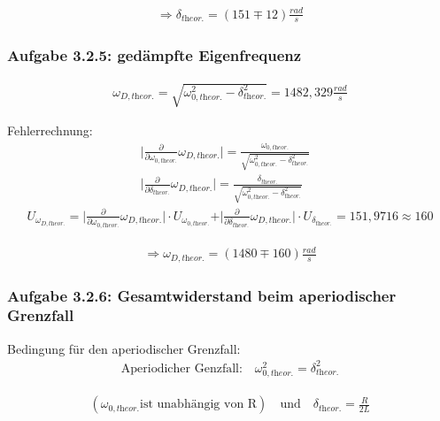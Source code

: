 \documentclass[a4paper]{scrartcl}
\numberwithin{equation}{subsection}
\begin{document}
\begin{align*}
\Rightarrow \delta_{\textit{theor.}} = (151 \mp 12) \frac{rad}{s}
\end{align*}

\subsubsection{Aufgabe 3.2.5: gedämpfte Eigenfrequenz}

\begin{align}
\omega_{D,\textit{theor.}} = \sqrt{\omega_{0,\textit{theor.}}^2 - \delta_{\textit{theor.}}^2} = 1482,329 \frac{rad}{s}
\end{align}

Fehlerrechnung:
\begin{align*}
\vert \frac{\partial}{\partial \omega_{0,\textit{theor.}}}\omega_{D,\textit{theor.}}\vert = \frac{\omega_{0,\textit{theor.}}}{\sqrt{\omega_{0,\textit{theor.}}^2 - \delta_{\textit{theor.}}^2}} &\\
\vert \frac{\partial}{\partial \delta_{\textit{theor.}}}\omega_{D,\textit{theor.}}\vert = \frac{\delta_{\textit{theor.}}}{\sqrt{\omega_{0,\textit{theor.}}^2 - \delta_{\textit{theor.}}^2}} &
\end{align*}
\begin{align*}
U_{\omega_{D,\textit{theor.}}} = \vert \frac{\partial}{\partial \omega_{0,\textit{theor.}}}\omega_{D,\textit{theor.}}\vert \cdot U_{\omega_{0,\textit{theor.}}} + \vert \frac{\partial}{\partial \delta_{\textit{theor.}}}\omega_{D,\textit{theor.}}\vert \cdot U_{\delta_{\textit{theor.}}} = 151,9716 \approx 160
\end{align*}

\begin{align*}
\Rightarrow \omega_{D,\textit{theor.}} = (1480 \mp 160) \frac{rad}{s}
\end{align*}

\subsubsection{Aufgabe 3.2.6: Gesamtwiderstand beim aperiodischer Grenzfall}

Bedingung für den aperiodischer Grenzfall:
\begin{align}
\text{Aperiodicher Genzfall:} \quad \omega_{0,\textit{theor.}}^2 = \delta_{\textit{theor.}}^2
\end{align}

\begin{align*}
(\omega_{0,\textit{theor.}} \text{ist unabhängig von R}) \quad \text{und} \quad
\delta_{\textit{theor.}} = \frac{R}{2L}
\end{align*}
\end{document}
